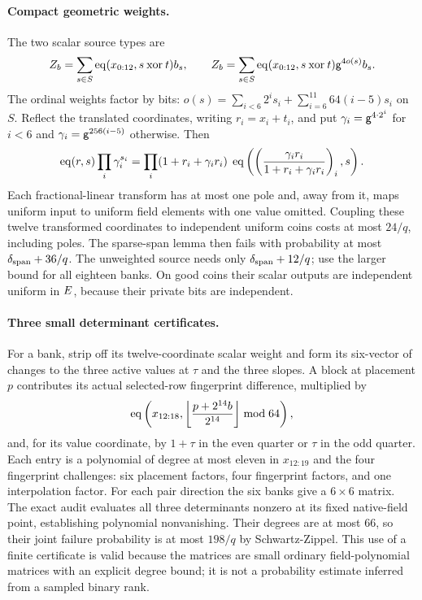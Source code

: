 \documentclass[11pt]{article}
\begin{document}
\paragraph{Compact geometric weights.} The two scalar source types are
\[
 Z_b=\sum_{s\in S}\operatorname{eq}(x_{0:12},s\mathbin{\mathrm{xor}}t)b_s,
 \qquad
 Z_b=\sum_{s\in S}\operatorname{eq}(x_{0:12},s\mathbin{\mathrm{xor}}t)
                    \mathsf{g}^{4o(s)}b_s.
\]
The ordinal weights factor by bits: $o(s)=\sum_{i<6}2^is_i+\sum_{i=6}^{11}64(i-5)s_i$ on $S$. Reflect the translated coordinates, writing $r_i=x_i+t_i$, and put $\gamma_i=\mathsf{g}^{4\cdot2^i}$ for $i<6$ and $\gamma_i=\mathsf{g}^{256(i-5)}$ otherwise. Then
\[
 \operatorname{eq}(r,s)\prod_i\gamma_i^{s_i}
 =\prod_i(1+r_i+\gamma_i r_i)\;
   \operatorname{eq}\left(\left(\frac{\gamma_i r_i}{1+r_i+\gamma_i r_i}\right)_i,s\right).
\]
Each fractional-linear transform has at most one pole and, away from it, maps uniform input to uniform field elements with one value omitted. Coupling these twelve transformed coordinates to independent uniform coins costs at most $24/q$, including poles. The sparse-span lemma then fails with probability at most $\delta_{\rm span}+36/q$. The unweighted source needs only $\delta_{\rm span}+12/q$; use the larger bound for all eighteen banks. On good coins their scalar outputs are independent uniform in $E$, because their private bits are independent.

\paragraph{Three small determinant certificates.} For a bank, strip off its twelve-coordinate scalar weight and form its six-vector of changes to the three active values at $\tau$ and the three slopes. A block at placement $p$ contributes its actual selected-row fingerprint difference, multiplied by
\[
 \operatorname{eq}\left(x_{12:18},\left\lfloor
          \frac{p+2^{14}b}{2^{14}}\right\rfloor\bmod64\right),
\]
and, for its value coordinate, by $1+\tau$ in the even quarter or $\tau$ in the odd quarter. Each entry is a polynomial of degree at most eleven in $x_{12:19}$ and the four fingerprint challenges: six placement factors, four fingerprint factors, and one interpolation factor. For each pair direction the six banks give a $6\times6$ matrix. The exact audit evaluates all three determinants nonzero at its fixed native-field point, establishing polynomial nonvanishing. Their degrees are at most $66$, so their joint failure probability is at most $198/q$ by Schwartz-Zippel. This use of a finite certificate is valid because the matrices are small ordinary field-polynomial matrices with an explicit degree bound; it is not a probability estimate inferred from a sampled binary rank.
\end{document}
